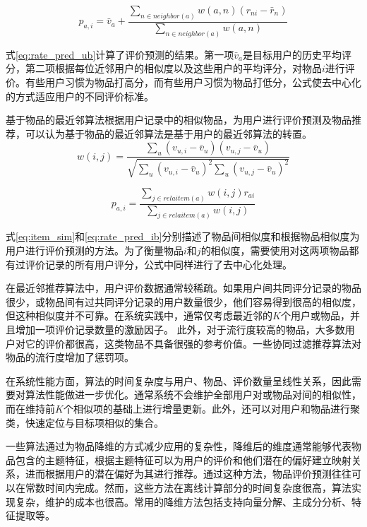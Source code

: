\begin{equation}
\label{eq:rate_pred_ub}
	p_{a,i} = \bar{v}_a + \frac{\sum_{n \in neighbor(a)}w(a,n)(r_{ni} - \bar{r}_n)}{\sum_{n \in neighbor(a)}w(a,n)}
\end{equation}

式\ref{eq:rate_pred_ub}计算了评价预测的结果。第一项$\bar{v}_a$是目标用户的历史平均评分，第二项根据每位近邻用户的相似度以及这些用户的平均评分，对物品$i$进行评价。有些用户习惯为物品打高分，而有些用户习惯为物品打低分，公式使去中心化的方式适应用户的不同评价标准。

基于物品的最近邻算法根据用户记录中的相似物品，为用户进行评价预测及物品推荐\cite{sarwar2001item}，可以认为基于物品的最近邻算法是基于用户的最近邻算法的转置。
\begin{equation}
\label{eq:item_sim}
	w(i,j) = \frac{\sum_u(v_{u,i}-\bar{v}_u)(v_{u,j}-\bar{v}_u)}{\sqrt{\sum_u(v_{u,i}-\bar{v}_u)^2\sum_u(v_{u,j}-\bar{v}_u)^2}}
\end{equation}

\begin{equation}
\label{eq:rate_pred_ib}
	p_{a,i} = \frac{\sum_{j \in relaitem(a)}w(i,j)r_{ai}}{\sum_{j \in relaitem(a)}w(i,j)}
\end{equation}

式\ref{eq:item_sim}和\ref{eq:rate_pred_ib}分别描述了物品间相似度和根据物品相似度为用户进行评价预测的方法。为了衡量物品$i$和$j$的相似度，需要使用对这两项物品都有过评价记录的所有用户评分，公式中同样进行了去中心化处理。

在最近邻推荐算法中，用户评价数据通常较稀疏。如果用户间共同评分记录的物品很少，或物品间有过共同评分记录的用户数量很少，他们容易得到很高的相似度，但这种相似度并不可靠。在系统实践中，通常仅考虑最近邻的$K$个用户或物品，并且增加一项评价记录数量的激励因子。
此外，对于流行度较高的物品，大多数用户对它的评价都很高，这类物品不具备很强的参考价值。一些协同过滤推荐算法\cite{breese1998empirical}对物品的流行度增加了惩罚项。

在系统性能方面，算法的时间复杂度与用户、物品、评价数量呈线性关系，因此需要对算法性能做进一步优化。通常系统不会维护全部用户对或物品对间的相似性，而在维持前$K$个相似项的基础上进行增量更新\cite{herlocker1999algorithmic}。此外，还可以对用户和物品进行聚类，快速定位与目标项相似的集合。

一些算法通过为物品降维的方式减少应用的复杂性，降维后的维度通常能够代表物品包含的主题特征，根据主题特征可以为用户的评价和他们潜在的偏好建立映射关系，进而根据用户的潜在偏好为其进行推荐。通过这种方法，物品评价预测往往可以在常数时间内完成。然而，这些方法在离线计算部分的时间复杂度很高，算法实现复杂，维护的成本也很高。常用的降维方法包括支持向量分解、主成分分析、特征提取等。

